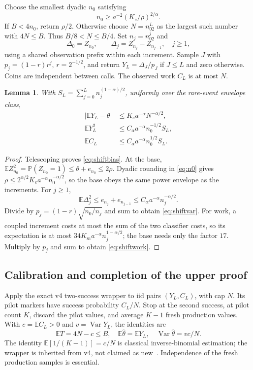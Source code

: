 \documentclass[11pt]{article}
\newtheorem{lemma}[theorem]{Lemma}
\theoremstyle{definition}\newtheorem{conjecture}[theorem]{Conjecture}
\theoremstyle{remark}\newtheorem{remark}[theorem]{Remark}
\newcommand{\E}{\mathbb E}\newcommand{\PP}{\mathbb P}\newcommand{\R}{\mathbb R}
\newcommand{\Var}{\operatorname{Var}}\newcommand{\TV}{\operatorname{TV}}
\begin{document}
Choose the smallest dyadic $n_0$ satisfying
\begin{equation}\label{eq:n0}
 n_0\ge a^{-2}(K_e/\rho)^{2/\alpha}.
\end{equation}
If $B<4n_0$, return $\rho/2$. Otherwise choose $N=n_02^L$ as the largest such number with $4N\le B$. Thus $B/8<N\le B/4$. Set $n_j=n_02^j$ and
\[
 \Delta_0=Z_{n_0},\qquad \Delta_j=Z_{n_j}-Z_{n_{j-1}},\quad j\ge1,
\]
using a shared observation prefix within each increment. Sample $J$ with
$p_j=(1-r)r^j$, $r=2^{-1/2}$, and return $Y_L=\Delta_J/p_J$ if $J\le L$ and zero otherwise. Coins are independent between calls. The observed work $C_L$ is at most $N$.

\begin{lemma}\label{lem:shiftbounds}
With $S_L=\sum_{j=0}^L n_j^{(1-\alpha)/2}$, uniformly over the rare-event envelope class,
\begin{align}
 |\E Y_L-\theta|&\le K_e a^{-\alpha}N^{-\alpha/2},\label{eq:shiftbias}\\
 \E Y_L^2&\le C_\alpha a^{-\alpha}n_0^{-1/2}S_L,\label{eq:shiftvar}\\
 \E C_L&\le C_\alpha a^{-\alpha}n_0^{1/2}S_L.\label{eq:shiftwork}
\end{align}
\end{lemma}
\begin{proof}
Telescoping proves \eqref{eq:shiftbias}. At the base,
$\E Z_{n_0}^2=\PP(Z_{n_0}=1)\le\theta+e_{n_0}\le2\rho$.
Dyadic rounding in \eqref{eq:n0} gives
$\rho\le2^{\alpha/2}K_e a^{-\alpha}n_0^{-\alpha/2}$, so the base obeys the same power envelope as the increments. For $j\ge1$,
\[
 \E\Delta_j^2\le e_{n_j}+e_{n_{j-1}}\le C_\alpha a^{-\alpha}n_j^{-\alpha/2}.
\]
Divide by $p_j=(1-r)\sqrt{n_0/n_j}$ and sum to obtain \eqref{eq:shiftvar}. For work, a coupled increment costs at most the sum of the two classifier costs, so its expectation is at most $34K_m a^{-\alpha}n_j^{1-\alpha/2}$; the base needs only the factor $17$. Multiply by $p_j$ and sum to obtain \eqref{eq:shiftwork}.
\end{proof}

\subsection{Calibration and completion of the upper proof}
Apply the exact v4 two-success wrapper to iid pairs $(Y_L,C_L)$, with cap $N$. Its pilot markers have success probability $C_L/N$. Stop at the second success, at pilot count $K$, discard the pilot values, and average $K-1$ fresh production values. With $c=\E C_L>0$ and $v=\Var Y_L$, the identities are
\begin{equation}\label{eq:calibration}
 \E T=4N-c\le B,\quad \E\widehat\theta=\E Y_L,\quad
 \Var\widehat\theta=vc/N.
\end{equation}
The identity $\E[1/(K-1)]=c/N$ is classical inverse-binomial estimation; the wrapper is inherited from v4, not claimed as new~\cite{baseline,mendo}. Independence of the fresh production samples is essential.
\end{document}
